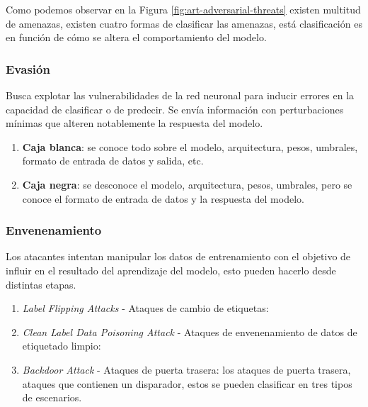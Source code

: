 Como podemos observar en la Figura \ref{fig:art-adversarial-threats} existen multitud de amenazas, existen cuatro formas de clasificar las amenazas, está clasificación es en función de cómo se altera el comportamiento del modelo.

\subsubsection{Evasión}

Busca explotar las vulnerabilidades de la red neuronal para inducir errores en la capacidad de clasificar o de predecir. Se envía información con perturbaciones mínimas que alteren notablemente la respuesta del modelo.

\begin{enumerate}
    \item \textbf{Caja blanca}: se conoce todo sobre el modelo, arquitectura, pesos, umbrales, formato de entrada de datos y salida, etc. \cite{learning-machine-learning-part-3-attacking}
    \item \textbf{Caja negra}: se desconoce el modelo, arquitectura, pesos, umbrales, pero se conoce el formato de entrada de datos y la respuesta del modelo. \cite{learning-machine-learning-part-3-attacking}
\end{enumerate}

\subsubsection{Envenenamiento}

Los atacantes intentan manipular los datos de entrenamiento con el objetivo de influir en el resultado del aprendizaje del modelo, esto pueden hacerlo desde distintas etapas.


\begin{enumerate}
    \item \textit{Label Flipping Attacks} - Ataques de cambio de etiquetas:
    \item \textit{Clean Label Data Poisoning Attack} - Ataques de envenenamiento de datos de etiquetado limpio:
    \item \textit{Backdoor Attack} - Ataques de puerta trasera: los ataques de puerta trasera, ataques que contienen un disparador, estos se pueden clasificar en tres tipos de escenarios.
\end{enumerate}

